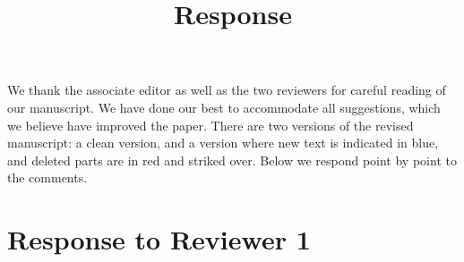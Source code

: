 \documentclass{amsart}
\title[]{Response}
\theoremstyle{plain}
\theoremstyle{remark}
\newcommand {\1}{\mathbb{1}}
\begin{document}
\maketitle

We thank the associate editor as well as the two reviewers for careful reading of our manuscript. We have done our best to accommodate all suggestions, which we believe have improved the paper. There are two versions of the revised manuscript: a clean version, and a version where new text is indicated in blue, and deleted parts are in red and striked over. Below we respond point by point to the comments. 


\section{Response to Reviewer 1}
\end{document}
